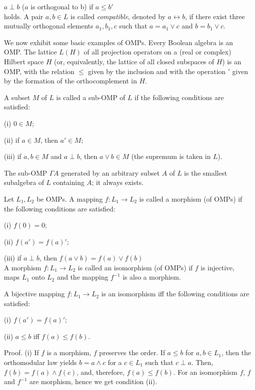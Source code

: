 $ a \perp b$ ($a$ is orthogonal to b) if $a \le b'$ \\
holds. A pair $a,b \in L$ is called {\em compatible}, denoted by
$a \leftrightarrow b$, if there exist three mutually orthogonal
elements $a_1,b_1,c$ such that $a = a_1 \vee c$ and $b = b_1 \vee c$.

We now exhibit some basic examples of OMPs.
Every Boolean algebra is an OMP.
The lattice $L(H)$ of all projection operators on a (real or complex)
Hilbert space $H$ (or, equivalently, the lattice of all closed subspaces of
$H$) is an OMP, with the relation $\le$ given by the inclusion and with
the operation $'$ given by the formation of the orthocomplement in $H$.

\begin{defin}
\label{sub-OMP}
A subset $M$ of $L$ is called a sub-OMP of $L$ if the following conditions
are satisfied:

(i) $0 \in M$;

(ii) if $a \in M$, then $a' \in M$;

(iii) if $a,b \in M$ and $a \perp b$, then $a \vee b \in M$
(the supremum is taken in $L$).
\end{defin}

The sub-OMP $\Gamma A$ generated by an arbitrary subset $A$ of $L$
is the smallest subalgebra of $L$ containing $A$; it always exists.

\begin{defin}
\label{morphism}
Let $L_1,L_2$ be OMPs.
A mapping $f: L_1 \rightarrow L_2$ is called a morphism (of OMPs)
if the following conditions are satisfied:

(i) $f(0) = 0$;

(ii) $f(a') = f(a)'$;

(iii) if $a \perp b$, then $f(a \vee b) = f(a) \vee f(b)$ \\
A morphism $f: L_1 \rightarrow L_2$ is called an isomorphism (of OMPs) if $f$ is
injective, maps $L_1$ onto $L_2$ and the mapping $f^{-1}$ is also
a morphism.
\end{defin}

\begin{lemma}
\label{isomorphism}
A bijective mapping $f: L_1 \rightarrow L_2$ is an isomorphism iff
the following conditions are satisfied:

(i) $f(a') = f(a)'$;

(ii) $a \le b$ iff $f(a) \le f(b)$.
\end{lemma}

Proof.
(i) If $f$ is a morphism, $f$ preserves the order.
If $a \le b$ for $a,b \in L_1$, then the orthomodular law yields
$b = a \wedge c$ for a $c \in L_1$ such that $c \perp a$.
Then, $f(b) = f(a) \wedge f(c)$, and, therefore, $f(a) \le f(b)$.
For an isomorphism $f$, $f$ and $f^{-1}$ are morphism, hence we
get condition (ii).

